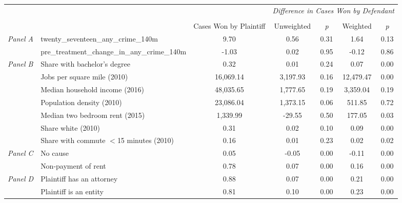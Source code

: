 \begin{tabular}{llccccc}
\toprule
 &  & \textit{} & \multicolumn{4}{c}{\textit{Difference in Cases Won by Defendant}} \\
\cline{4-7}
\\
 &  & Cases Won by Plaintiff & Unweighted & \emph{p} & Weighted & \emph{p} \\
\midrule
\multirow[c]{2}{3cm}{\textit{Panel A}} & twenty_seventeen_any_crime_140m & 9.70 & 0.56 & 0.31 & 1.64 & 0.13 \\
 & pre_treatment_change_in_any_crime_140m & -1.03 & 0.02 & 0.95 & -0.12 & 0.86 \\
\cline{1-7}
\multirow[c]{7}{3cm}{\textit{Panel B}} & Share with bachelor's degree & 0.32 & 0.01 & 0.24 & 0.07 & 0.00 \\
 & Jobs per square mile (2010) & 16,069.14 & 3,197.93 & 0.16 & 12,479.47 & 0.00 \\
 & Median household income (2016) & 48,035.65 & 1,777.65 & 0.19 & 3,359.04 & 0.19 \\
 & Population density (2010) & 23,086.04 & 1,373.15 & 0.06 & 511.85 & 0.72 \\
 & Median two bedroom rent (2015) & 1,339.99 & -29.55 & 0.50 & 177.05 & 0.03 \\
 & Share white (2010) & 0.31 & 0.02 & 0.10 & 0.09 & 0.00 \\
 & Share with commute $<$15 minutes (2010) & 0.16 & 0.01 & 0.23 & 0.02 & 0.02 \\
\cline{1-7}
\multirow[c]{2}{3cm}{\textit{Panel C}} & No cause & 0.05 & -0.05 & 0.00 & -0.11 & 0.00 \\
 & Non-payment of rent & 0.78 & 0.07 & 0.00 & 0.16 & 0.00 \\
\cline{1-7}
\multirow[c]{2}{3cm}{\textit{Panel D}} & Plaintiff has an attorney & 0.88 & 0.07 & 0.00 & 0.21 & 0.00 \\
 & Plaintiff is an entity & 0.81 & 0.10 & 0.00 & 0.23 & 0.00 \\
\cline{1-7}
\bottomrule
\end{tabular}
